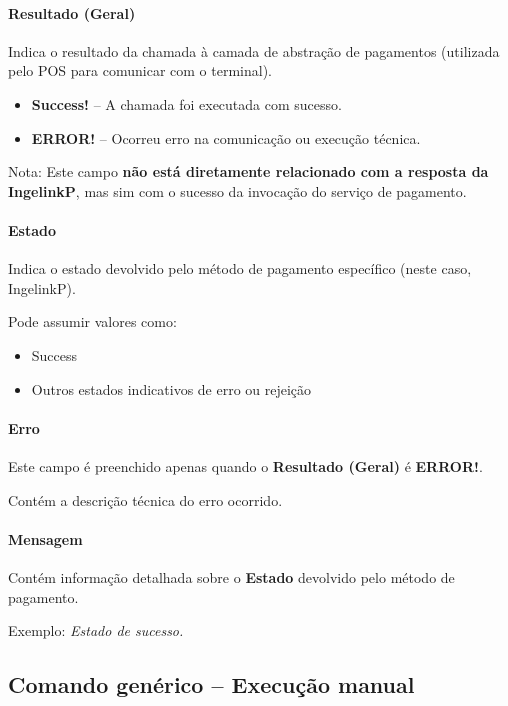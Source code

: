 \documentclass[a4paper,12pt]{article}
\begin{document}
\paragraph{Resultado (Geral)}

Indica o resultado da chamada à camada de abstração de pagamentos
(utilizada pelo POS para comunicar com o terminal).

\begin{itemize}
    \item \textbf{Success!} -- A chamada foi executada com sucesso.
    \item \textbf{ERROR!} -- Ocorreu erro na comunicação ou execução técnica.
\end{itemize}

Nota: Este campo \textbf{não está diretamente relacionado com a resposta da
IngelinkP}, mas sim com o sucesso da invocação do serviço de pagamento.

\paragraph{Estado}

Indica o estado devolvido pelo método de pagamento específico
(neste caso, IngelinkP).

Pode assumir valores como:

\begin{itemize}
    \item Success
    \item Outros estados indicativos de erro ou rejeição
\end{itemize}

\paragraph{Erro}

Este campo é preenchido apenas quando o
\textbf{Resultado (Geral)} é \textbf{ERROR!}.

Contém a descrição técnica do erro ocorrido.

\paragraph{Mensagem}

Contém informação detalhada sobre o \textbf{Estado}
devolvido pelo método de pagamento.

Exemplo: \textit{Estado de sucesso.}

\subsection{Comando genérico -- Execução manual}
\end{document}
